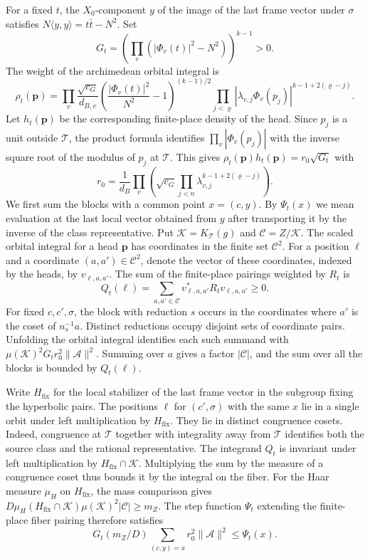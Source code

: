For a fixed \(t\), the \(X_0\)-component \(y\) of the image of the last
frame vector under \(\sigma\) satisfies \(N\langle y,y\rangle=t\bar t-N^2\).
Set
\[
 G_t=\left(\prod_v(|\Phi_v(t)|^2-N^2)\right)^{k-1}>0 .
\]
The weight of the
archimedean orbital integral is
\[
 \rho_t(\mathbf p)=
 \prod_v \frac{\sqrt{c_G}}{d_{B,v}}
 \left(\frac{|\Phi_v(t)|^2}{N^2}-1\right)^{(k-1)/2}
 \prod_{j<\varrho}|\lambda_{v,j}\Phi_v(p_j)|^{k-1+2(\varrho-j)} .
\]
Let \(h_t(\mathbf p)\) be the corresponding finite-place density of
the head. Since \(p_j\) is a unit outside \(\mathcal T\), the product
formula identifies \(\prod_v|\Phi_v(p_j)|\) with the inverse square root
of the modulus of \(p_j\) at \(\mathcal T\). This gives
\(\rho_t(\mathbf p)h_t(\mathbf p)=r_0\sqrt{G_t}\) with
\[
 r_0=\frac{1}{d_B}\prod_v
       \left(\sqrt{c_G}\prod_{j<n}\lambda_{v,j}^{k-1+2(\varrho-j)}\right).
\]
We first sum the blocks with a common point \(x=(c,y)\).
By \(\Psi_t(x)\) we mean evaluation at the last local vector obtained
from \(y\) after transporting it by the inverse of the class representative.
Put \(\mathcal K=K_{\mathcal T}(g)\) and \(\mathcal C=Z/\mathcal K\).
The scaled orbital integral for a head \(\mathbf p\) has coordinates
in the finite set \(\mathcal C^2\). For a position \(\ell\) and a
coordinate \((a,a')\in\mathcal C^2\), denote the vector of these
coordinates, indexed by the heads, by \(v_{\ell,a,a'}\).
The sum of the finite-place pairings weighted by \(R_t\) is
\[
 Q_t(\ell)=\sum_{a,a'\in\mathcal C} v_{\ell,a,a'}^*R_t v_{\ell,a,a'}\ge0 .
\]
For fixed \(c,c',\sigma\), the block with reduction \(s\) occurs in
the coordinates where \(a'\) is the coset of \(n_s^{-1}a\).
Distinct reductions occupy disjoint sets of coordinate pairs.
Unfolding the orbital integral identifies each such summand with
\(\mu(\mathcal K)^2G_t r_0^2\|\mathcal A\|^2\). Summing over \(a\) gives
a factor \(|\mathcal C|\), and the sum over all the blocks is bounded by
\(Q_t(\ell)\).

Write \(H_{\mathrm{fix}}\) for the local stabilizer of the last frame
vector in the subgroup fixing the hyperbolic pairs. The positions
\(\ell\) for \((c',\sigma)\) with the same \(x\) lie in a single orbit
under left multiplication by \(H_{\mathrm{fix}}\). They lie in distinct
congruence cosets. Indeed, congruence at \(\mathcal T\) together with
integrality away from \(\mathcal T\) identifies both the source class
and the rational representative. The integrand \(Q_t\) is invariant
under left multiplication by \(H_{\mathrm{fix}}\cap\mathcal K\).
Multiplying the sum by the measure of a congruence coset thus bounds it
by the integral on the fiber. For the Haar measure \(\mu_H\) on
\(H_{\mathrm{fix}}\), the mass comparison gives
\(D\mu_H(H_{\mathrm{fix}}\cap\mathcal K)\mu(\mathcal K)^2|\mathcal C|\ge m_Z\).
The step function \(\Psi_t\) extending the finite-place fiber pairing
therefore satisfies
\[
 G_t(m_Z/D)\sum_{(c,y)=x} r_0^2\|\mathcal A\|^2\le\Psi_t(x).
\]


